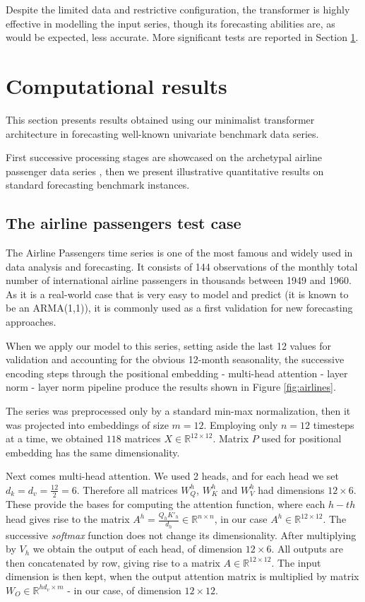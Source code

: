 \documentclass[algorithms,article,submit,pdftex,moreauthors]{Definitions/mdpi}
\begin{document}
Despite the limited data and restrictive configuration, the transformer is highly effective in modelling the input series, though its forecasting abilities are, as would be expected, less accurate. More significant tests are reported in Section \ref{sec:results}.

\section{Computational results} \label{sec:results}

This section presents results obtained using our minimalist transformer architecture in forecasting well-known univariate benchmark data series.

First successive processing stages are showcased on the archetypal airline passenger data series \citep{BJ70}, then we present illustrative quantitative results on standard forecasting benchmark instances.

\subsection{The airline passengers test case} \label{subsec:airlines}

The Airline Passengers time series is one of the most famous and widely used in data analysis and forecasting. It consists of 144 observations of the monthly total number of international airline passengers in thousands between 1949 and 1960. As it is a real-world case that is very easy to model and predict (it is known to be an ARMA(1,1)), it is commonly used as a first validation for new forecasting approaches.

When we apply our model to this series, setting aside the last 12 values for validation and accounting for the obvious 12-month seasonality, the successive encoding steps through the positional embedding - multi-head attention - layer norm - layer norm pipeline produce the results shown in Figure \ref{fig:airlines}.

The series was preprocessed only by a standard min-max normalization, then it was projected into embeddings of size $m = 12$. Employing only $n = 12$ timesteps at a time, we obtained $118$ matrices $X \in \mathbb{R}^{12 \times 12}$. Matrix $P$ used for positional embedding has the same dimensionality.

Next comes multi-head attention. We used 2 heads, and for each head we set $d_k = d_v = \frac{12}{2} = 6$. Therefore all matrices $W^h_Q$, $W^h_K$ and $W^h_V$ had dimensions $12 \times 6$. These provide the bases for computing the attention function, where each $h-th$ head gives rise to the matrix $A^h=\frac{Q_hK'_h}{d_h} \in \mathbb{R}^{n \times n}$, in our case $A^h \in \mathbb{R}^{12 \times 12}$. The successive {\em softmax} function does not change its dimensionality. After multiplying by $V_h$ we obtain the output of each head, of dimension $12 \times 6$. All outputs are then concatenated by row, giving rise to a matrix $A \in \mathbb{R}^{12 \times 12}$. The input dimension is then kept, when the output attention matrix is multiplied by matrix $W_O \in \mathbb{R}^{hd_v \times m}$ - in our case, of dimension $12 \times 12$.
\end{document}
